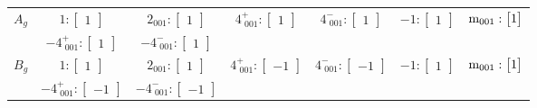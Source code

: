 \documentclass[fleqn,8pt,landscape]{jsarticle}
\begin{document}
\begin{longtable}{ccccccc}
$ A_{g} $ & $ 1:\begin{bmatrix} 1 \end{bmatrix} $ & $ 2{}_{001}:\begin{bmatrix} 1 \end{bmatrix} $ & $ 4^{+}_{\,\,001}:\begin{bmatrix} 1 \end{bmatrix} $ & $ 4^{-}_{\,\,001}:\begin{bmatrix} 1 \end{bmatrix} $ & $ -1:\begin{bmatrix} 1 \end{bmatrix} $ & $ {\rm m}_{001}:\begin{bmatrix} 1 \end{bmatrix} $ \\
& $ -4^{+}_{\,\,001}:\begin{bmatrix} 1 \end{bmatrix} $ & $ -4^{-}_{\,\,001}:\begin{bmatrix} 1 \end{bmatrix} $ & $  $ & $  $ & $  $ & $  $ \\ \hline
$ B_{g} $ & $ 1:\begin{bmatrix} 1 \end{bmatrix} $ & $ 2{}_{001}:\begin{bmatrix} 1 \end{bmatrix} $ & $ 4^{+}_{\,\,001}:\begin{bmatrix} -1 \end{bmatrix} $ & $ 4^{-}_{\,\,001}:\begin{bmatrix} -1 \end{bmatrix} $ & $ -1:\begin{bmatrix} 1 \end{bmatrix} $ & $ {\rm m}_{001}:\begin{bmatrix} 1 \end{bmatrix} $ \\
& $ -4^{+}_{\,\,001}:\begin{bmatrix} -1 \end{bmatrix} $ & $ -4^{-}_{\,\,001}:\begin{bmatrix} -1 \end{bmatrix} $ & $  $ & $  $ & $  $ & $  $ \\ \hline

\end{longtable}
\end{document}
